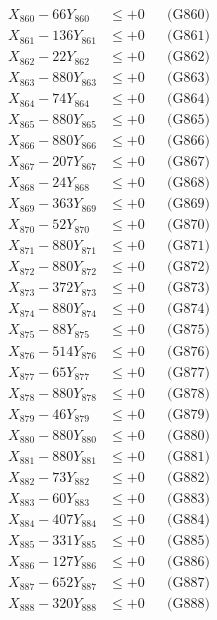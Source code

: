 \documentclass[a4paper,10pt]{article}
\begin{document}
{\begin{align}
X_{860} - 66Y_{860} &\leq +0 && \text{(G860)} \\
\allowbreak
X_{861} - 136Y_{861} &\leq +0 && \text{(G861)} \\
X_{862} - 22Y_{862} &\leq +0 && \text{(G862)} \\
X_{863} - 880Y_{863} &\leq +0 && \text{(G863)} \\
X_{864} - 74Y_{864} &\leq +0 && \text{(G864)} \\
X_{865} - 880Y_{865} &\leq +0 && \text{(G865)} \\
X_{866} - 880Y_{866} &\leq +0 && \text{(G866)} \\
X_{867} - 207Y_{867} &\leq +0 && \text{(G867)} \\
X_{868} - 24Y_{868} &\leq +0 && \text{(G868)} \\
X_{869} - 363Y_{869} &\leq +0 && \text{(G869)} \\
X_{870} - 52Y_{870} &\leq +0 && \text{(G870)} \\
\allowbreak
X_{871} - 880Y_{871} &\leq +0 && \text{(G871)} \\
X_{872} - 880Y_{872} &\leq +0 && \text{(G872)} \\
X_{873} - 372Y_{873} &\leq +0 && \text{(G873)} \\
X_{874} - 880Y_{874} &\leq +0 && \text{(G874)} \\
X_{875} - 88Y_{875} &\leq +0 && \text{(G875)} \\
X_{876} - 514Y_{876} &\leq +0 && \text{(G876)} \\
X_{877} - 65Y_{877} &\leq +0 && \text{(G877)} \\
X_{878} - 880Y_{878} &\leq +0 && \text{(G878)} \\
X_{879} - 46Y_{879} &\leq +0 && \text{(G879)} \\
X_{880} - 880Y_{880} &\leq +0 && \text{(G880)} \\
\allowbreak
X_{881} - 880Y_{881} &\leq +0 && \text{(G881)} \\
X_{882} - 73Y_{882} &\leq +0 && \text{(G882)} \\
X_{883} - 60Y_{883} &\leq +0 && \text{(G883)} \\
X_{884} - 407Y_{884} &\leq +0 && \text{(G884)} \\
X_{885} - 331Y_{885} &\leq +0 && \text{(G885)} \\
X_{886} - 127Y_{886} &\leq +0 && \text{(G886)} \\
X_{887} - 652Y_{887} &\leq +0 && \text{(G887)} \\
X_{888} - 320Y_{888} &\leq +0 && \text{(G888)} \\

\end{align}}
\end{document}

